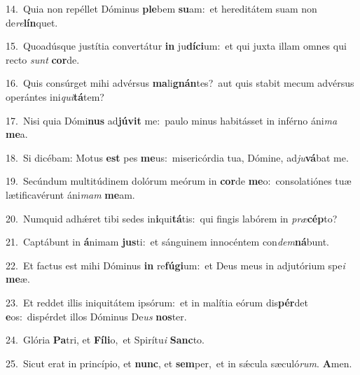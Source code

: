 {\numbfont\textcolor{\numbcolor}{14.}}~Quia non repéllet Dóminus \textbf{ple}\-bem \textbf{su}\-am:~\star et hereditátem suam non de\-\textit{re}\-\textbf{lín}quet.\par
{\numbfont\textcolor{\numbcolor}{15.}}~Quoadúsque justítia convertátur \textbf{in} ju\-\textbf{dí}\-\textbf{ci}um:~\star et qui juxta illam omnes qui recto \textit{sunt} \textbf{cor}\-de.\par
{\numbfont\textcolor{\numbcolor}{16.}}~Quis consúrget mihi advérsus \textbf{ma}\-li\-\textbf{gnán}\-tes?~\star aut quis stabit mecum advérsus operántes ini\-\textit{qui}\-\textbf{tá}tem?\par
{\numbfont\textcolor{\numbcolor}{17.}}~Nisi quia Dómi\textbf{nus} ad\-\textbf{jú}\-\textbf{vit} me:~\star paulo minus habitásset in inférno áni\textit{ma} \textbf{me}\-a.\par
{\numbfont\textcolor{\numbcolor}{18.}}~Si dicébam: Motus \textbf{est} pes \textbf{me}\-us:~\star misericórdia tua, Dómine, ad\-\textit{ju}\-\textbf{vá}bat me.\par
{\numbfont\textcolor{\numbcolor}{19.}}~Secúndum multitúdinem dolórum meórum in \textbf{cor}\-de \textbf{me}\-o:~\star consolatiónes tuæ lætificavérunt áni\textit{mam} \textbf{me}\-am.\par
{\numbfont\textcolor{\numbcolor}{20.}}~Numquid adhǽret tibi sedes in\-\textbf{i}\-qui\-\textbf{tá}\-tis:~\star qui fingis labórem in \textit{præ}\-\textbf{cép}to?\par
{\numbfont\textcolor{\numbcolor}{21.}}~Captábunt in \textbf{á}\-nimam \textbf{jus}\-ti:~\star et sánguinem innocéntem con\-\textit{dem}\-\textbf{ná}bunt.\par
{\numbfont\textcolor{\numbcolor}{22.}}~Et factus est mihi Dóminus \textbf{in} re\-\textbf{fú}\-\textbf{gi}um:~\star et Deus meus in adjutórium spe\textit{i} \textbf{me}\-æ.\par
{\numbfont\textcolor{\numbcolor}{23.}}~Et reddet illis iniquitátem ipsórum:~\dagger et in malítia eórum dis\-\textbf{pér}\-det \textbf{e}\-os:~\star dispérdet illos Dóminus De\textit{us} \textbf{nos}\-ter.\par
{\numbfont\textcolor{\numbcolor}{24.}}~Glória \textbf{Pa}\-tri, et \textbf{Fí}\-\textbf{li}o,~\star et Spirítu\textit{i} \textbf{Sanc}\-to.\par
{\numbfont\textcolor{\numbcolor}{25.}}~Sicut erat in princípio, et \textbf{nunc}\-, et \textbf{sem}\-per,~\star et in sǽcula sæculó\-\textit{rum}\-. \textbf{A}\-men.\par
